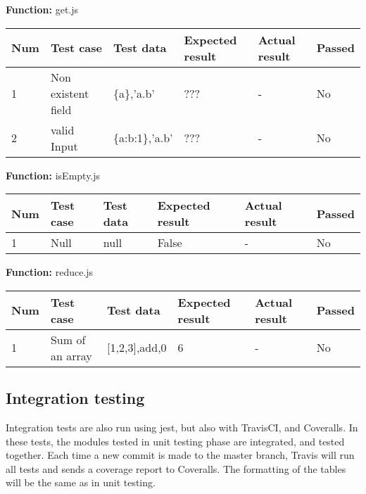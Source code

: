 \documentclass[a4paper, 12pt]{article}
\begin{document}
\newpage
    
        \textbf{Function:} get.js
        
        \begin{table}[h!]
           \begin{tabular}{|l|p{3cm}|p{2cm}|p{2cm}|p{2.5cm}|l|}
                \hline
                Num & Test case        					& Test data 					& Expected result 					& Actual result 		& Passed \\ \hline
                1   & Non  existent field 				& \{a\},'a.b'     				& ???               				& -             		& No     \\ \hline
                2   & valid Input 						& \{a:b:1\},'a.b'     			& ???               				& -             		& No     \\ \hline
            \end{tabular}
        \end{table}

        \textbf{Function:} isEmpty.js
        
        \begin{table}[h!]
           \begin{tabular}{|l|p{3cm}|p{2cm}|p{2cm}|p{2.5cm}|l|}
                \hline
                Num & Test case         						& Test data 					& Expected result 					& Actual result 		& Passed \\ \hline
                1   & Null 										& null     						& False                				& -             		& No     \\ \hline
            \end{tabular}
        \end{table}
    
        \textbf{Function:} reduce.js
        
        \begin{table}[h!]
           \begin{tabular}{|l|p{3cm}|p{2cm}|p{2cm}|p{2.5cm}|l|}
                \hline
                Num & Test case        					& Test data 					& Expected result 					& Actual result 		& Passed \\ \hline
                1   & Sum of an array 					& {[}1,2,3{]},add,0     		& 6                					& -             		& No     \\ \hline
            \end{tabular}
        \end{table}

    \subsection{Integration testing}
        Integration tests are also run using jest, but also with TravisCI, and Coveralls. In these tests, the modules tested in unit testing phase are integrated, and tested together. Each time a new commit is made to the master branch, Travis will run all tests and sends a coverage report to Coveralls. The formatting of the tables will be the same as in unit testing. 
\end{document}
